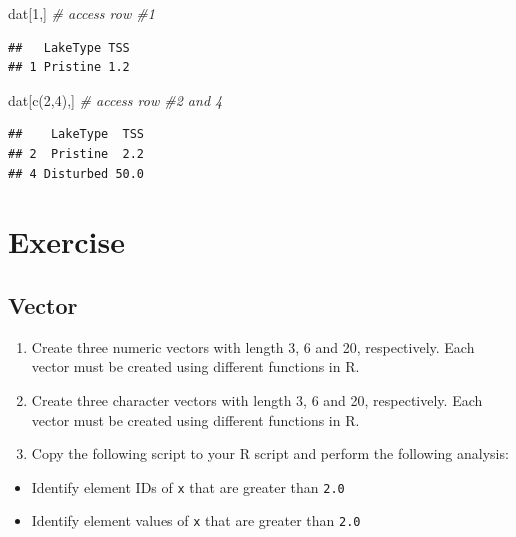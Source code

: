 \documentclass[
]{book}
\newenvironment{Shaded}{\begin{snugshade}}{\end{snugshade}}
\newcommand{\CommentTok}[1]{\textcolor[rgb]{0.56,0.35,0.01}{\textit{#1}}}
\newcommand{\DecValTok}[1]{\textcolor[rgb]{0.00,0.00,0.81}{#1}}
\newcommand{\FunctionTok}[1]{\textcolor[rgb]{0.00,0.00,0.00}{#1}}
\newcommand{\NormalTok}[1]{#1}
\providecommand{\tightlist}{%
  \setlength{\itemsep}{0pt}\setlength{\parskip}{0pt}}
\begin{document}
\begin{Shaded}
\begin{Highlighting}[]
\NormalTok{dat[}\DecValTok{1}\NormalTok{,] }\CommentTok{\# access row \#1}
\end{Highlighting}
\end{Shaded}

\begin{verbatim}
##   LakeType TSS
## 1 Pristine 1.2
\end{verbatim}

\begin{Shaded}
\begin{Highlighting}[]
\NormalTok{dat[}\FunctionTok{c}\NormalTok{(}\DecValTok{2}\NormalTok{,}\DecValTok{4}\NormalTok{),] }\CommentTok{\# access row \#2 and 4}
\end{Highlighting}
\end{Shaded}

\begin{verbatim}
##    LakeType  TSS
## 2  Pristine  2.2
## 4 Disturbed 50.0
\end{verbatim}

\hypertarget{exercise}{%
\section{Exercise}\label{exercise}}

\hypertarget{vector-1}{%
\subsection{Vector}\label{vector-1}}

\begin{enumerate}
\def\labelenumi{\alph{enumi}.}
\tightlist
\item
  Create three numeric vectors with length 3, 6 and 20, respectively. Each vector must be created using different functions in R.
\item
  Create three character vectors with length 3, 6 and 20, respectively. Each vector must be created using different functions in R.
\item
  Copy the following script to your R script and perform the following analysis:
\end{enumerate}

\begin{itemize}
\tightlist
\item
  Identify element IDs of \texttt{x} that are greater than \texttt{2.0}
\item
  Identify element values of \texttt{x} that are greater than \texttt{2.0}
\end{itemize}
\end{document}
